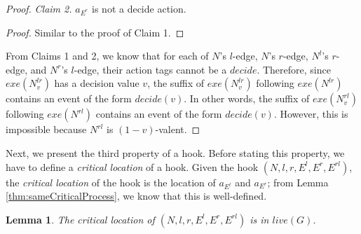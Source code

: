 \documentclass[11pt]{article}
\numberwithin{theorem}{section}
\newtheorem{lemma}[theorem]{Lemma}
\begin{document}
\begin{proof}
\emph{Claim 2.} $a_{E^r}$ is not a decide action.
\begin{proof}
Similar to the proof of Claim 1.
\end{proof}

 From Claims 1 and 2, we know that for each of  $N$'s $l$-edge, $N$'s $r$-edge, $N^l$'s $r$-edge, and $N^r$'s $l$-edge, their action tags cannot be a $decide$. Therefore, since $exe(N^{lr}_{v})$ has a decision value $v$, the suffix of $exe(N^{lr}_{v})$ following $exe(N^{lr})$ contains an event of the form $decide(v)$. In other words, the suffix of $exe(N^{rl}_{v})$ following $exe(N^{rl})$ contains an event of the form $decide(v)$. However, this is impossible because $N^{rl}$ is $(1-v)$-valent.
\end{proof}



Next, we present the third property of a hook. Before stating this property, we have to define a \emph{critical location} of a hook. Given the hook $(N,l,r,E^l,E^r,E^{rl})$, the \emph{critical location} of the hook is the location of $a_{E^l}$ and $a_{E^r}$; from Lemma \ref{thm:sameCriticalProcess}, we know that this is well-defined. 

\begin{lemma}\label{thm:criticalProcessCorrect}
The critical location of $(N,l,r,E^l,E^r,E^{rl})$ is in $live(G)$.
\end{lemma}
\end{document}
